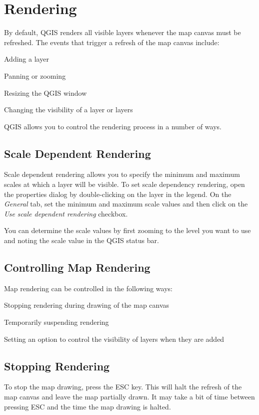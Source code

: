 \section{Rendering}\label{subsec:redraw_events}
By default, QGIS renders all visible layers whenever the map canvas must be
refreshed. The events that trigger a refresh of the map canvas include:
\begin{compactitem}
\item Adding a layer
\item Panning or zooming
\item Resizing the QGIS window
\item Changing the visibility of a layer or layers
\end{compactitem}
QGIS allows you to control the rendering process in a number of ways.

\subsection{Scale Dependent Rendering}
Scale dependent rendering allows you to specify the minimum and maximum scales
at which a layer will be visible.  To set scale dependency rendering, open the
properties dialog by double-clicking on the layer in the legend. On the
\textit{General} tab, set the minimum and maximum scale values and then click on
the \textit{Use scale dependent rendering} checkbox.

You can determine the scale values by first zooming to the level you want to use
and noting the scale value in the QGIS status bar.
\subsection{Controlling Map Rendering}
Map rendering can be controlled in the following ways:
\begin{compactenum}
\item Stopping rendering during drawing of the map canvas
\item Temporarily suspending rendering
\item Setting an option to control the visibility of layers when they are added
\end{compactenum}
\subsection{Stopping Rendering}
To stop the map drawing, press the ESC key. This will halt the refresh of the
map canvas and leave the map partially drawn. It may take a bit of time between
pressing ESC and the time the map drawing is halted.
